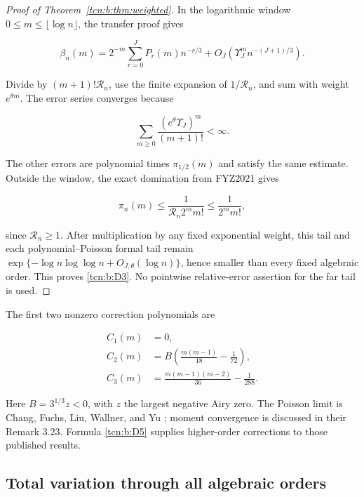 \documentclass[11pt,letterpaper]{article}
\theoremstyle{remark}
\begin{document}
\begin{proof}[Proof of Theorem~\ref{tcn:b:thm:weighted}] In the logarithmic window
\(0\le m\le\lfloor\log n\rfloor\), the transfer proof gives

\[
 \beta_n(m)=2^{-m}\sum_{r=0}^JP_r(m)n^{-r/3}
        +O_J(\Upsilon_J^m n^{-(J+1)/3}).                            \tag{D4}\label{tcn:b:D4}
\]

Divide by \((m+1)!\mathcal R_n\), use the finite expansion of \(1/\mathcal R_n\), and sum
with weight \(e^{\theta m}\). The error series converges because

\[
 \sum_{m\ge0}\frac{(e^\theta \Upsilon_J)^m}{(m+1)!}<\infty.
\]

The other errors are polynomial times \(\pi_{1/2}(m)\) and satisfy the same
estimate. Outside the window, the exact domination from FYZ2021 gives

\[
 \pi_n(m)\le\frac1{\mathcal R_n2^m m!}\le\frac1{2^m m!},
\]

since \(\mathcal R_n\ge1\). After multiplication by any fixed exponential weight,
this tail and each polynomial--Poisson formal tail remain
\(\exp\{-\log n\log\log n+O_{J,\theta}(\log n)\}\), hence smaller than
every fixed algebraic order. This proves \eqref{tcn:b:D3}. No pointwise
relative-error assertion for the far tail is used.
\end{proof}

The first two nonzero correction polynomials are

\[
 \begin{aligned}
 C_1(m)&=0,\\
 C_2(m)&=B\left(\frac{m(m-1)}{18}-\frac1{72}\right),\\
 C_3(m)&=\frac{m(m-1)(m-2)}{36}-\frac1{288}.
 \end{aligned}                                               \tag{D5}\label{tcn:b:D5}
\]

Here \(B=3^{1/3}z<0\), with \(z\) the largest negative Airy zero. The
Poisson limit is Chang, Fuchs, Liu, Wallner, and Yu \cite[Theorem
1.9 and equation (26)]{Chang2024}; moment convergence is discussed in their Remark
3.23. Formula \eqref{tcn:b:D5} supplies higher-order corrections to those published
results.

\subsection{Total variation through all algebraic
orders}\label{tcn:b:total-variation-through-all-algebraic-orders}
\end{document}
